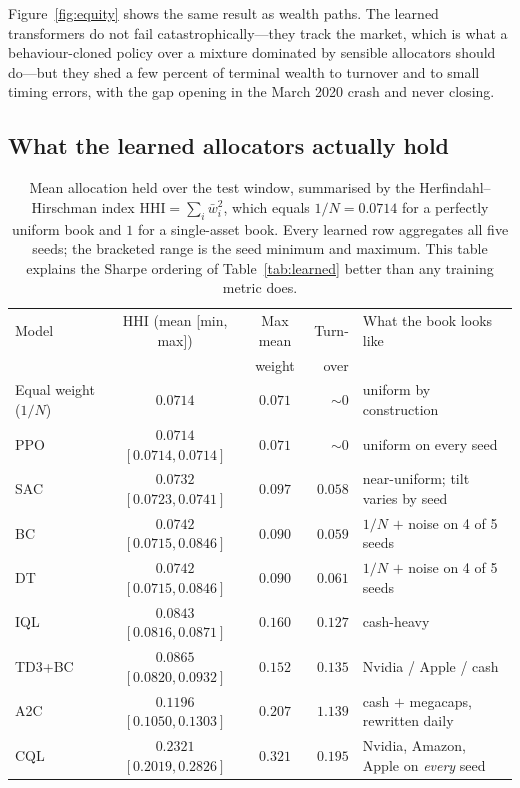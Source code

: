 \documentclass[11pt]{article}
\begin{document}
Figure~\ref{fig:equity} shows the same result as wealth paths. The learned transformers do not
fail catastrophically---they track the market, which is what a behaviour-cloned policy over a
mixture dominated by sensible allocators should do---but they shed a few percent of terminal
wealth to turnover and to small timing errors, with the gap opening in the March 2020 crash and
never closing.

\subsection{What the learned allocators actually hold}

\begin{table}[h]
\centering
\caption{Mean allocation held over the test window, summarised by the Herfindahl--Hirschman
index $\mathrm{HHI} = \sum_i \bar{w}_i^2$, which equals $1/N = 0.0714$ for a perfectly uniform
book and $1$ for a single-asset book. Every learned row aggregates all five seeds; the bracketed
range is the seed minimum and maximum. This table explains the Sharpe ordering of
Table~\ref{tab:learned} better than any training metric does.}
\label{tab:concentration}
\small
\begin{tabular}{lccrl}
\toprule
Model & HHI (mean [min, max]) & Max mean & Turn- & What the book looks like \\
      &                       & weight   & over  & \\
\midrule
Equal weight ($1/N$) & $0.0714$ & $0.071$ & $\sim 0$ & uniform by construction \\
PPO    & $0.0714$ $[0.0714, 0.0714]$ & $0.071$ & $\sim 0$ & uniform on every seed \\
SAC    & $0.0732$ $[0.0723, 0.0741]$ & $0.097$ & $0.058$ & near-uniform; tilt varies by seed \\
BC     & $0.0742$ $[0.0715, 0.0846]$ & $0.090$ & $0.059$ & $1/N$ $+$ noise on 4 of 5 seeds \\
DT     & $0.0742$ $[0.0715, 0.0846]$ & $0.090$ & $0.061$ & $1/N$ $+$ noise on 4 of 5 seeds \\
IQL    & $0.0843$ $[0.0816, 0.0871]$ & $0.160$ & $0.127$ & cash-heavy \\
TD3+BC & $0.0865$ $[0.0820, 0.0932]$ & $0.152$ & $0.135$ & Nvidia / Apple / cash \\
A2C    & $0.1196$ $[0.1050, 0.1303]$ & $0.207$ & $1.139$ & cash $+$ megacaps, rewritten daily \\
CQL    & $0.2321$ $[0.2019, 0.2826]$ & $0.321$ & $0.195$ & Nvidia, Amazon, Apple on \emph{every} seed \\
\bottomrule
\end{tabular}
\end{table}
\end{document}
